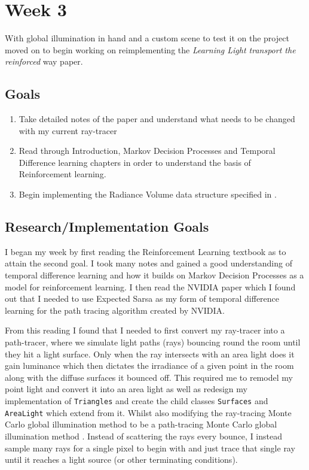 \documentclass[conference]{IEEEtran}
\begin{document}
\section*{Week 3}
With global illumination in hand and a custom scene to test it on the project moved on to begin working on reimplementing the \textit{Learning Light transport the reinforced} way \cite{dahm2017learning} paper.

\subsection{Goals}
\begin{enumerate}
\item Take detailed notes of the \cite{dahm2017learning} paper and understand what needs to be changed with my current ray-tracer
\item Read through \cite{reinforcement-learning-book} Introduction, Markov Decision Processes and Temporal Difference learning chapters in order to understand the basis of Reinforcement learning.
\item Begin implementing the Radiance Volume data structure specified in \cite{dahm2017learning}.
\end{enumerate}

\subsection{Research/Implementation Goals}
I began my week by first reading the Reinforcement Learning textbook \cite{reinforcement-learning-book} as to attain the second goal. I took many notes and gained a good understanding of temporal difference learning and how it builds on Markov Decision Processes as a model for reinforcement learning. I then read the NVIDIA paper  \cite{dahm2017learning} which I found out that I needed to use Expected Sarsa as my form of temporal difference learning for the path tracing algorithm created by NVIDIA. 

From this reading I found that I needed to first convert my ray-tracer into a path-tracer, where we simulate light paths (rays) bouncing round the room until they hit a light surface. Only when the ray intersects with an area light does it gain luminance which then dictates the irradiance of a given point in the room along with the diffuse surfaces it bounced off. This required me to remodel my point light and convert it into an area light as well as redesign my implementation of \verb|Triangles| and create the child classes \verb|Surfaces| and \verb|AreaLight| which extend from it. Whilst also modifying the ray-tracing Monte Carlo global illumination method to be a path-tracing Monte Carlo global illumination method \cite{pathtracing}. Instead of scattering the rays every bounce, I instead sample many rays for a single pixel to begin with and just trace that single ray until it reaches a light source (or other terminating conditions).
\end{document}

